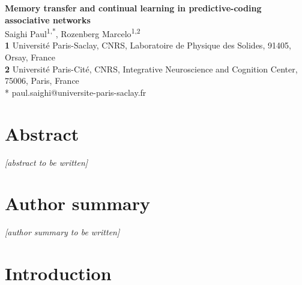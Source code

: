 \documentclass[10pt,letterpaper]{article}
\theoremstyle{plain}
\theoremstyle{remark}
\begin{document}
\begin{flushleft}
{\Large\textbf{Memory transfer and continual learning in predictive-coding associative networks}}
\newline\\
Saighi Paul\textsuperscript{1,*},\;
Rozenberg Marcelo\textsuperscript{1,2}
\\
\bigskip
\textbf{1} Universit\'e Paris-Saclay, CNRS, Laboratoire de Physique des Solides, 91405, Orsay, France\\
\textbf{2} Universit\'e Paris-Cit\'e, CNRS, Integrative Neuroscience and Cognition Center, 75006, Paris, France
\\
\bigskip
* paul.saighi@universite-paris-saclay.fr
\end{flushleft}

\section*{Abstract}
\textit{[abstract to be written]}

\section*{Author summary}
\textit{[author summary to be written]}

\linenumbers

\section{Introduction}
\end{document}

